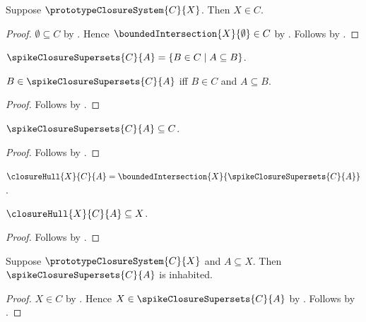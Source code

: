 \begin{proposition}\label{spike_prototype_closure_system_top}
    Suppose $\prototypeClosureSystem{C}{X}$.
    Then $X\in C$.
\end{proposition}
\begin{proof}
    $\emptyset\subseteq C$ by .
    Hence $\boundedIntersection{X}{\emptyset}\in C$ by
        .
    Follows by .
\end{proof}

\begin{definition}\label{spike_closure_supersets}
    $\spikeClosureSupersets{C}{A}
        =\{B\in C\mid A\subseteq B\}$.
\end{definition}

\begin{proposition}\label{spike_closure_supersets_iff}
    $B\in\spikeClosureSupersets{C}{A}$ iff
        $B\in C$ and $A\subseteq B$.
\end{proposition}
\begin{proof}
    Follows by .
\end{proof}

\begin{proposition}\label{spike_closure_supersets_subseteq}
    $\spikeClosureSupersets{C}{A}\subseteq C$.
\end{proposition}
\begin{proof}
    Follows by .
\end{proof}

\begin{definition}\label{spike_closure_hull}
    $\closureHull{X}{C}{A}
        =\boundedIntersection{X}{\spikeClosureSupersets{C}{A}}$.
\end{definition}

\begin{proposition}\label{spike_closure_hull_subseteq}
    $\closureHull{X}{C}{A}\subseteq X$.
\end{proposition}
\begin{proof}
    Follows by
        .
\end{proof}

\begin{proposition}\label{spike_closure_supersets_inhabited}
    Suppose $\prototypeClosureSystem{C}{X}$ and $A\subseteq X$.
    Then $\spikeClosureSupersets{C}{A}$ is inhabited.
\end{proposition}
\begin{proof}
    $X\in C$ by .
    Hence $X\in\spikeClosureSupersets{C}{A}$ by
        .
    Follows by \auto.
\end{proof}

